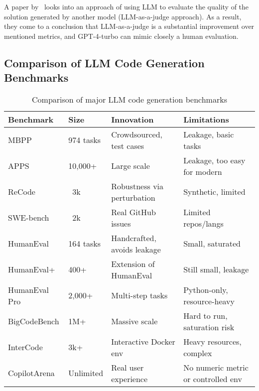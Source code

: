 A paper by~\cite{crupi2025effectiveness} looks into an approach of using LLM to evaluate the quality of the solution generated by another model (LLM-as-a-judge approach).
As a result, they come to a conclusion that LLM-as-a-judge is a substantial improvement over mentioned metrics, and GPT-4-turbo can mimic closely a human evaluation.

\subsection{Comparison of LLM Code Generation Benchmarks}


\begin{table}[h!]
    \centering
    \begin{tabular}{|l|l|p{5.3cm}|p{5.3cm}|}
        \hline
        \textbf{Benchmark} & \textbf{Size} & \textbf{Innovation} & \textbf{Limitations} \\
        \hline
        MBPP & 974 tasks & Crowdsourced, test cases & Leakage, basic tasks \\
        \hline
        APPS & 10,000+ & Large scale & Leakage, too easy for modern \\
        \hline
        ReCode & ~3k & Robustness via perturbation & Synthetic, limited \\
        \hline
        SWE-bench & ~2k & Real GitHub issues & Limited repos/langs \\
        \hline
        HumanEval & 164 tasks & Handcrafted, avoids leakage & Small, saturated \\
        \hline
        HumanEval+ & 400+ & Extension of HumanEval & Still small, leakage \\
        \hline
        HumanEval Pro & 2,000+ & Multi-step tasks & Python-only, resource-heavy \\
        \hline
        BigCodeBench & 1M+ & Massive scale & Hard to run, saturation risk \\
        \hline
        InterCode & 3k+  & Interactive Docker env & Heavy resources, complex \\
        \hline
        CopilotArena & Unlimited & Real user experience & No numeric metric or controlled env \\
        \hline
    \end{tabular}
    \caption{Comparison of major LLM code generation benchmarks}\label{tab:bench-compare-table}
\end{table}



